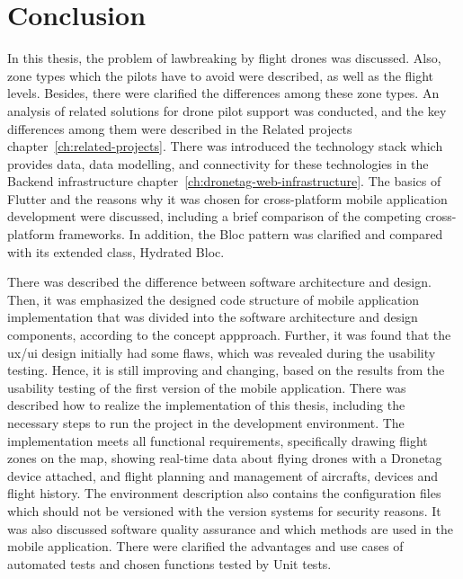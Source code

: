 \chapter{Conclusion}\label{ch:conclusion}
In this thesis, the problem of lawbreaking by flight drones was discussed.
Also, zone types which the pilots have to avoid were described, as well as the flight levels.
Besides, there were clarified the differences among these zone types.
An analysis of related solutions for drone pilot support was conducted, and the key differences among them were described in the Related projects chapter~\ref{ch:related-projects}.
There was introduced the technology stack which provides data, data modelling, and connectivity for these technologies in the Backend infrastructure chapter~\ref{ch:dronetag-web-infrastructure}.
The basics of Flutter and the reasons why it was chosen for cross-platform mobile application development were discussed, including a brief comparison of the competing cross-platform frameworks.
In addition, the Bloc pattern was clarified and compared with its extended class, Hydrated Bloc.

There was described the difference between software architecture and design.
Then, it was emphasized the designed code structure of mobile application implementation that was divided into the software architecture and design components, according to the concept appproach.
Further, it was found that the \acrshort{ux}/\acrshort{ui} design initially had some flaws, which was revealed during the usability testing.
Hence, it is still improving and changing, based on the results from the usability testing of the first version of the mobile application.
There was described how to realize the implementation of this thesis, including the necessary steps to run the project in the development environment.
The implementation meets all functional requirements, specifically drawing flight zones on the map, showing real-time data about flying drones with a Dronetag device attached, and flight planning and management of aircrafts, devices and flight history.
The environment description also contains the configuration files which should not be versioned with the version systems for security reasons.
It was also discussed software quality assurance and which methods are used in the mobile application.
There were clarified the advantages and use cases of automated tests and chosen functions tested by Unit tests.

